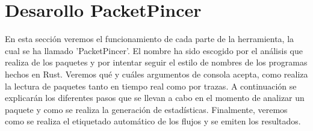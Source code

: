 \section{Desarollo PacketPincer}

En esta sección veremos el funcionamiento de cada parte de la herramienta, la cual se ha llamado 'PacketPincer'. El nombre ha sido escogido por el análisis que realiza de los paquetes y por intentar seguir el estilo de nombres de los programas hechos en Rust. Veremos qué y cuáles argumentos de consola acepta, como realiza la lectura de paquetes tanto en tiempo real como por trazas. A continuación se explicarán los diferentes pasos que se llevan a cabo en el momento de analizar un paquete y como se realiza la generación de estadísticas. Finalmente, veremos como se realiza el etiquetado automático de los flujos y se emiten los resultados.

